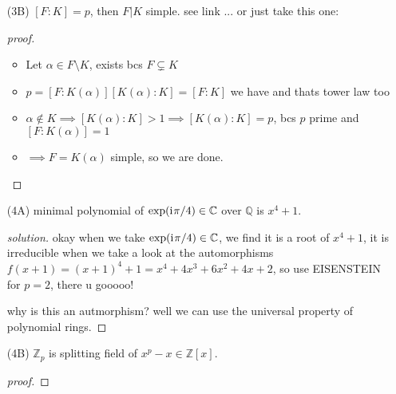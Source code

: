 \documentclass[]{scrartcl}
\newcommand{\Z}{\mathbb{Z}}
\newcommand{\Q}{\mathbb{Q}}
\newcommand{\C}{\mathbb{C}}
\newcommand{\<}{\trianglelefteq}
\newcommand{\ii}{\mathrm{i}\mkern1mu}    					%
\begin{document}
\begin{itemize}
\begin{proof}[proof]
	The same arguments work with minor modifications if $ F|E $ or $ E|K $ are infinite. In particular, we obtain 
	a $ K $-basis of infinite length for $ F $ if one of $ [E:F] $ or $ [E:K] $ are infinite.
\end{proof}
	\begin{proof}[proof sketch]
		test 
	\end{proof}
	\item[(3B)] $[F\colon K] = p$, then $F|K$ simple.
		see link ...
		or just take this one:
		\begin{proof}[proof]
			\begin{itemize}
				\item Let $\alpha \in F\setminus K$, exists bcs $F \subsetneq K$
				\item $p = [F \colon K(\alpha)][K(\alpha)\colon K] = [F \colon K]$ we have and thats tower law too
				\item $\alpha \notin K \implies [K(\alpha)\colon K] > 1 \implies [K(\alpha) \colon K] = p$, bcs $p$ prime and $[F \colon K(\alpha)] = 1$
				\item $\implies F = K(\alpha)$ simple, so we are done.
			\end{itemize}
		\end{proof}
	\item[(4A)] minimal polynomial of $\exp(\ii \pi/4) \in \C$ over $\Q$ is $x^4+1$.
	\begin{proof}[solution]
		okay when we take $\exp(\ii \pi/4) \in \C$, we find it is a root of $x^4+1$, it is irreducible when we take a look at the automorphisms $f(x+1) = (x+1)^4 + 1 = x^4+4x^3+6x^2+4x +2$, so use EISENSTEIN for $p=2$, there u gooooo!
		
		why is this an autmorphism? well we can use the universal property of polynomial rings. %
	\end{proof}
	\item[(4B)] $\Z_p$ is splitting field of $x^p - x \in \Z[x]$.
	\begin{proof}[proof]
		

\end{proof}
\end{itemize}
\end{document}

